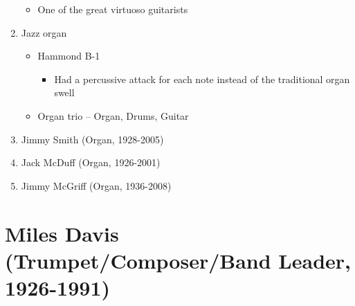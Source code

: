 \documentclass[]{article}
\providecommand{\tightlist}{%
  \setlength{\itemsep}{0pt}\setlength{\parskip}{0pt}}
\begin{document}
\begin{enumerate}
  \begin{itemize}
  \tightlist
  \item
    One of the great virtuoso guitarists
  \end{itemize}
\item
  Jazz organ

  \begin{itemize}
  \tightlist
  \item
    Hammond B-1

    \begin{itemize}
    \tightlist
    \item
      Had a percussive attack for each note instead of the traditional
      organ swell
    \end{itemize}
  \item
    Organ trio -- Organ, Drums, Guitar
  \end{itemize}
\item
  Jimmy Smith (Organ, 1928-2005)
\item
  Jack McDuff (Organ, 1926-2001)
\item
  Jimmy McGriff (Organ, 1936-2008)
\end{enumerate}

\section{Miles Davis (Trumpet/Composer/Band Leader,
1926-1991)}\label{miles-davis-trumpetcomposerband-leader-1926-1991}
\end{document}

